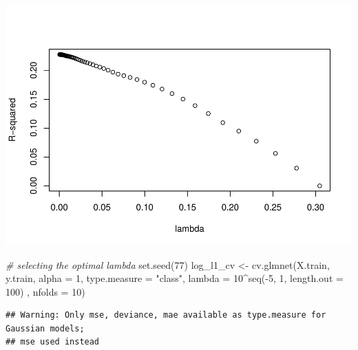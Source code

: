 \documentclass[
]{article}
\newenvironment{Shaded}{\begin{snugshade}}{\end{snugshade}}
\newcommand{\AttributeTok}[1]{\textcolor[rgb]{0.77,0.63,0.00}{#1}}
\newcommand{\CommentTok}[1]{\textcolor[rgb]{0.56,0.35,0.01}{\textit{#1}}}
\newcommand{\DecValTok}[1]{\textcolor[rgb]{0.00,0.00,0.81}{#1}}
\newcommand{\FunctionTok}[1]{\textcolor[rgb]{0.00,0.00,0.00}{#1}}
\newcommand{\NormalTok}[1]{#1}
\newcommand{\OtherTok}[1]{\textcolor[rgb]{0.56,0.35,0.01}{#1}}
\newcommand{\SpecialCharTok}[1]{\textcolor[rgb]{0.00,0.00,0.00}{#1}}
\newcommand{\StringTok}[1]{\textcolor[rgb]{0.31,0.60,0.02}{#1}}
\begin{document}
\includegraphics{1992-US-election_files/figure-latex/unnamed-chunk-11-2.pdf}

\begin{Shaded}
\begin{Highlighting}[]
\CommentTok{\# selecting the optimal lambda}
\FunctionTok{set.seed}\NormalTok{(}\DecValTok{77}\NormalTok{)}
\NormalTok{log\_l1\_cv }\OtherTok{\textless{}{-}} \FunctionTok{cv.glmnet}\NormalTok{(X.train, y.train, }\AttributeTok{alpha =} \DecValTok{1}\NormalTok{, }\AttributeTok{type.measure =} \StringTok{"class"}\NormalTok{, }
                       \AttributeTok{lambda =} \DecValTok{10}\SpecialCharTok{\^{}}\FunctionTok{seq}\NormalTok{(}\SpecialCharTok{{-}}\DecValTok{5}\NormalTok{, }\DecValTok{1}\NormalTok{, }\AttributeTok{length.out =} \DecValTok{100}\NormalTok{) , }\AttributeTok{nfolds =} \DecValTok{10}\NormalTok{)}
\end{Highlighting}
\end{Shaded}

\begin{verbatim}
## Warning: Only mse, deviance, mae available as type.measure for Gaussian models;
## mse used instead
\end{verbatim}

\begin{Shaded}
\end{Shaded}
\end{document}
